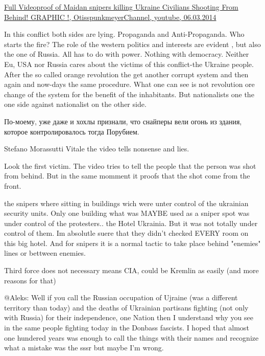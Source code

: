 \begin{itemize}
\begin{itemize}

\href{http://youtu.be/xnBa0Uj3Ijw}{%
Full Videoproof of Maidan snipers killing Ukraine Civilians Shooting From Behind! GRAPHIC !, %
OtisspunkmeyerChannel, youtube, 06.03.2014%
}


In this conflict both sides are lying. Propaganda and Anti-Propaganda. Who
starts the fire? The role of the western politics and interests are evident ,
but also the one of Russia. All has to do with power. Nothing with democracy.
Neither Eu, USA nor Russia cares about the victims of this conflict-the Ukraine
people. After the so called orange revolution the get another corrupt system
and then again and now-days the same procedure. What one can see is not
revolution ore change of the system for the benefit of the inhabitants. But
nationalists one the one side against nationalist on the other side.

По-моему, уже даже и хохлы признали, что снайперы вели огонь из здания, которое контролировалось тогда Порубием.



Stefano Morassutti Vitale the video tells nonsense and lies.

Look the first victim. The video tries to tell the people that the person was
shot from behind. But in the same momment it proofs that the shot come from the
front.

the snipers where sitting in buildings wich were unter control of the ukrainian
security units. Only one building what was MAYBE used as a sniper spot was
under control of the protesters.. the Hotel Ukrainia. But it was not totally
under control of them. Im absolutle suere that they didn't checked EVERY room
on this big hotel. And for snipers it is a normal tactic to take place behind
"enemies" lines or bettween enemies.


Third force does not necessary means CIA, could be Kremlin as easily (and more
reasons for that)


@Aleks: Well if you call the Russian occupation of Ujraine (was a different
territory than today) and the deaths of Ukrainian partisans fighting (not only
with Russia) for their independence, one Nation then I understand why you see
in the same people fighting today in the Donbass fascists. I hoped that almost
one hundered years was enough to call the things with their names and recognize
what a mistake was the sssr but maybe I'm wrong.



\end{itemize}
\end{itemize}
